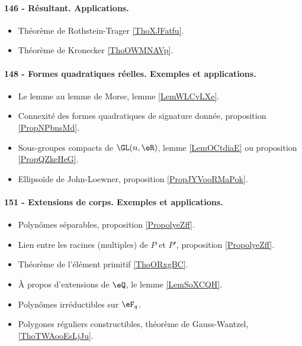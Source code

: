 \paragraph{146 - Résultant. Applications.}
\begin{itemize}
    \item Théorème de Rothstein-Trager \ref{ThoXJFatfu}.
    \item Théorème de Kronecker \ref{ThoOWMNAVp}.
\end{itemize}
\paragraph{148 - Formes quadratiques réelles. Exemples et applications.}
\begin{itemize}
    \item Le lemme au lemme de Morse, lemme \ref{LemWLCvLXe}.
    \item Connexité des formes quadratiques de signature donnée, proposition \ref{PropNPbnsMd}.
    \item Sous-groupes compacts de \( \GL(n,\eR)\), lemme \ref{LemOCtdiaE} ou proposition \ref{PropQZkeHeG}.
    \item Ellipsoïde de John-Loewner, proposition \ref{PropJYVooRMaPok}.
\end{itemize}
\paragraph{151 - Extensions de corps. Exemples et applications.}
\begin{itemize}
    \item Polynômes séparables, proposition \ref{PropolyeZff}.
    \item Lien entre les racines (multiples) de \( P\) et \( P'\), proposition \ref{PropolyeZff}.
    \item Théorème de l'élément primitif \ref{ThoORxgBC}.
    \item À propos d'extensions de \( \eQ\), le lemme \ref{LemSoXCQH}.
    \item Polynômes irréductibles sur \( \eF_q\).
    \item Polygones réguliers constructibles, théorème de Gauss-Wantzel, \ref{ThoTWAooEsLjJu}.
\end{itemize}
